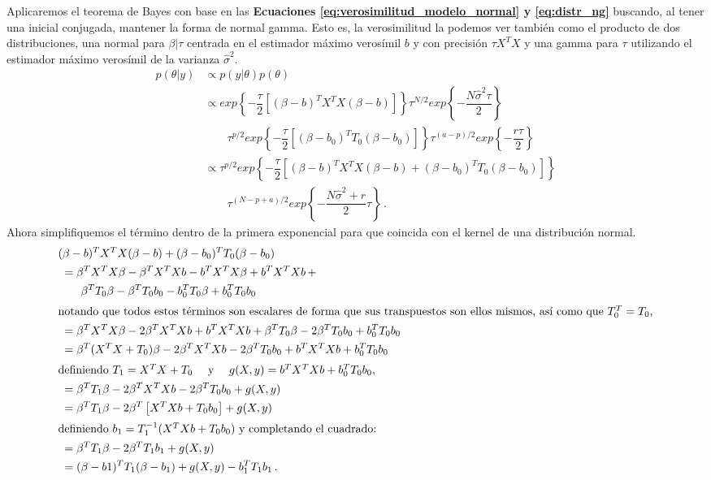 Aplicaremos el teorema de Bayes con base en las \textbf{Ecuaciones \ref{eq:verosimilitud_modelo_normal} y \ref{eq:distr_ng}} buscando, al tener una inicial conjugada, mantener la forma de normal gamma. Esto es, la verosimilitud la podemos ver también como el producto de dos distribuciones, una normal para $\beta|\tau$ centrada en el estimador máximo verosímil $b$ y con precisión $\tau X^TX$ y una gamma para $\tau$ utilizando el estimador máximo verosímil de la varianza $\hat{\sigma}^2$. 
\begin{align} \label{eq:post_normal_gamma_todo}
p(\theta|y) &\propto p(y|\theta)p(\theta)\nonumber \\
&\propto exp\left\lbrace -\dfrac{\tau}{2}\left[(\beta-b)^TX^TX(\beta-b)\right] \right\rbrace \tau^{N/2} exp\left\lbrace -\dfrac{N\hat{\sigma}^2\tau}{2}\right\rbrace \nonumber \\
&\qquad  \tau^{p/2} exp\left\lbrace -\dfrac{\tau}{2}\left[(\beta-b_0)^TT_0(\beta-b_0)\right] \right\rbrace \tau^{(a-p)/2} exp\left\lbrace -\dfrac{r\tau}{2}\right\rbrace \nonumber \\
&\propto \tau^{p/2} exp\left\lbrace -\dfrac{\tau}{2}\left[(\beta-b)^TX^TX(\beta-b) + (\beta-b_0)^TT_0(\beta-b_0)\right]\right\rbrace \nonumber \\
& \qquad \tau^{(N - p + a)/2} exp\left\lbrace -\dfrac{N\hat{\sigma}^2 + r}{2}\tau\right\rbrace \,.
\end{align}
Ahora simplifiquemos el término dentro de la primera exponencial para que coincida con el kernel de una distribución normal. 
\begin{align} \label{eq:termino_exp_post_normal_gamma}
&(\beta - b)^T X^TX (\beta-b) + (\beta - b_0)^T T_0 (\beta-b_0) \nonumber \\
&\; = \beta^TX^TX\beta - \beta^TX^TXb - b^TX^TX\beta + b^TX^TXb \,+ \nonumber \\ 
&\qquad \beta^TT_0\beta - \beta^TT_0b_0 - b_0^TT_0\beta + b_0^TT_0b_0  \nonumber \\
\intertext{notando que todos estos términos son escalares de forma que sus transpuestos son ellos mismos, así como que $T_0^T=T_0$,}\nonumber 
&\; = \beta^TX^TX\beta - 2\beta^TX^TXb + b^TX^TXb + \beta^TT_0\beta - 2\beta^TT_0b_0 + b_0^TT_0b_0 \nonumber \\
&\; = \beta^T(X^TX + T_0)\beta - 2\beta^TX^TXb - 2\beta^TT_0b_0 + b^TX^TXb + b_0^TT_0b_0 \nonumber \\
\intertext{definiendo $T_1=X^TX + T_0 \quad$ y $\quad g(X,y)=b^TX^TXb + b_0^TT_0b_0$,} \nonumber 
&\; = \beta^TT_1\beta - 2\beta^TX^TXb - 2\beta^TT_0b_0 + g(X,y) \nonumber \\
&\; = \beta^TT_1\beta - 2\beta^T\left[X^TXb + T_0b_0\right] + g(X,y) \nonumber \\
\intertext{definiendo $b_1=T_1^{-1}(X^TXb+T_0b_0)$ y completando el cuadrado:} \nonumber
&\; = \beta^TT_1\beta - 2\beta^TT_1b_1 + g(X,y) \nonumber \\
&\; = (\beta-b1)^TT_1(\beta-b_1) + g(X,y) - b_1^TT_1b_1 \,.
\end{align}
